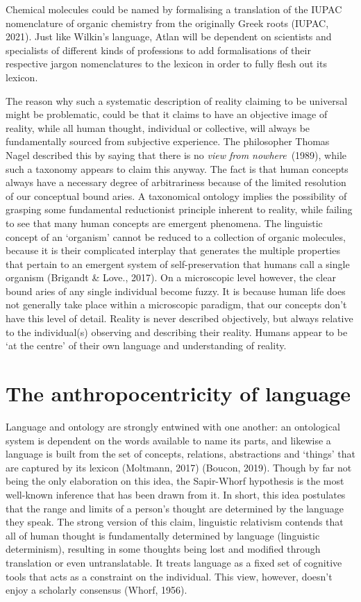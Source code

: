 Chemical molecules could be named by formalising a translation of the IUPAC nomenclature of organic chemistry from the originally Greek roots (IUPAC, 2021). Just like Wilkin’s language, Atlan will be dependent on scientists and specialists of different kinds of professions to add formalisations of their respective jargon nomenclatures to the lexicon in order to fully flesh out its lexicon. 

The reason why such a systematic description of reality claiming to be universal might be problematic, could be that it claims to have an objective image of reality, while all human thought, individual or collective, will always be fundamentally sourced from subjective experience. The philosopher Thomas Nagel described this by saying that there is no \textit{view from nowhere}\ (1989), while such a taxonomy appears to claim this anyway. The fact is that human concepts always have a necessary degree of arbitrariness because of the limited resolution of our conceptual bound aries. A taxonomical ontology implies the possibility of grasping some fundamental reductionist principle inherent to reality, while failing to see that many human concepts are emergent phenomena. The linguistic concept of an ‘organism’ cannot be reduced to a collection of organic molecules, because it is their complicated interplay that generates the multiple properties that pertain to an emergent system of self-preservation that humans call a single organism (Brigandt \& Love., 2017). On a microscopic level however, the clear bound aries of any single individual become fuzzy. It is because human life does not generally take place within a microscopic paradigm, that our concepts don’t have this level of detail. Reality is never described objectively, but always relative to the individual(s) observing and describing their reality. Humans appear to be ‘at the centre’ of their own language and understanding of reality. 

\section{The anthropocentricity of language}

Language and ontology are strongly entwined with one another: an ontological system is dependent on the words available to name its parts, and likewise a language is built from the set of concepts, relations, abstractions and ‘things’ that are captured by its lexicon  (Moltmann, 2017) (Boucon, 2019). Though by far not being the only elaboration on this idea, the Sapir-Whorf hypothesis is the most well-known inference that has been drawn from it. In short, this idea postulates that the range and limits of a person’s thought are determined by the language they speak. The strong version of this claim, linguistic relativism contends that all of human thought is fundamentally determined by language (linguistic determinism), resulting in some thoughts being lost and modified through translation or even untranslatable. It treats language as a fixed set of cognitive tools that acts as a constraint on the individual. This view, however, doesn’t enjoy a scholarly consensus (Whorf, 1956).  

